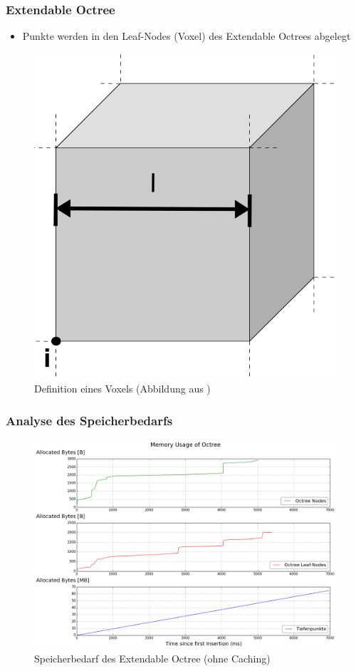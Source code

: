 \documentclass[presentation]{beamer}
\begin{document}
\begin{frame}
\frametitle{Extendable Octree}
\begin{itemize}%
	\item Punkte werden in den Leaf-Nodes (Voxel) des Extendable Octrees abgelegt 
\end{itemize}
\begin{figure}
\centering
\includegraphics[width=0.3\linewidth]{figures/relatedWorks/voxel_definition.png}
\caption{Definition eines Voxels (Abbildung aus \cite{Bodenmueller2009})}
\label{fig:voxel}
\end{figure}
\end{frame}

\begin{frame}
\frametitle{Analyse des Speicherbedarfs}
\begin{figure}
\centering
\includegraphics[width=0.7\linewidth]{figures/Benchmark_withoutCaching.png}
\caption{Speicherbedarf des Extendable Octree (ohne Caching)} %
\label{fig:BenchmarkWithoutCaching} 
\end{figure} 
\end{frame} 
\end{document}
